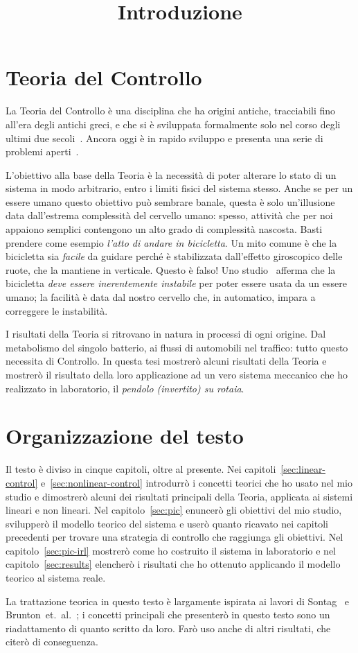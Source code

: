 
\title{Introduzione}
\maketitle
\label{sec:intro}


\section{Teoria del Controllo}
La Teoria del Controllo è una disciplina che ha origini antiche,
tracciabili fino all'era degli antichi greci,
e che si è sviluppata formalmente solo nel corso degli ultimi due secoli~\cite{history}.
Ancora oggi è in rapido sviluppo e presenta una serie di problemi aperti~\cite{blondel1999open}.

L'obiettivo alla base della Teoria è la necessità di poter alterare
lo stato di un sistema in modo arbitrario, entro i limiti fisici
del sistema stesso.
Anche se per un essere umano questo obiettivo può sembrare banale,
questa è solo un'illusione data dall'estrema complessità del cervello umano:
spesso, attività che per noi appaiono semplici contengono un
alto grado di complessità nascosta.
Basti prendere come esempio \emph{l'atto di andare in bicicletta}.
Un mito comune è che la bicicletta sia \emph{facile} da guidare perché
è stabilizzata dall'effetto giroscopico delle ruote, che la mantiene in verticale.
Questo è falso!
Uno studio~\cite{bicycle}
afferma che la bicicletta \emph{deve essere inerentemente instabile} per poter
essere usata da un essere umano; la facilità è data dal nostro cervello che,
in automatico, impara a correggere le instabilità.

I risultati della Teoria si ritrovano in natura in processi di ogni origine.
Dal metabolismo del singolo batterio, ai flussi di automobili nel traffico:
tutto questo necessita di Controllo.
In questa tesi mostrerò alcuni risultati della Teoria e
mostrerò il risultato della loro applicazione ad un vero sistema
meccanico che ho realizzato in laboratorio, il \emph{pendolo (invertito) su rotaia}.

\section{Organizzazione del testo}
Il testo è diviso in cinque capitoli, oltre al presente.
Nei capitoli~\ref{sec:linear-control} e~\ref{sec:nonlinear-control} introdurrò
i concetti teorici che ho usato nel mio studio e dimostrerò alcuni dei risultati
principali della Teoria, applicata ai sistemi lineari e non lineari.
Nel capitolo~\ref{sec:pic} enuncerò gli obiettivi del mio studio, svilupperò il modello
teorico del sistema e userò quanto ricavato nei capitoli
precedenti per trovare una strategia di controllo che raggiunga gli obiettivi.
Nel capitolo~\ref{sec:pic-irl} mostrerò come ho costruito il sistema in laboratorio
e nel capitolo~\ref{sec:results} elencherò i risultati che ho ottenuto applicando
il modello teorico al sistema reale.

La trattazione teorica in questo testo è largamente ispirata ai lavori di
Sontag~\cite{sontagMath} e Brunton~et.~al.~\cite{brunton_kutz_2019};
i concetti principali che presenterò in questo testo
sono un riadattamento di quanto scritto da loro.
Farò uso anche di altri risultati, che citerò di conseguenza.